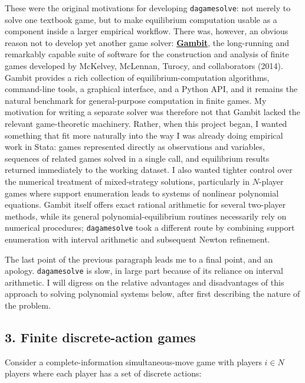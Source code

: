 \documentclass[11pt]{article}
\begin{document}
These were the original motivations for developing \texttt{dagamesolve}:
not merely to solve one textbook game, but to make equilibrium
computation usable as a component inside a larger empirical workflow.
There was, however, an obvious reason not to develop yet another game
solver: \href{https://www.gambit-project.org/}{\textbf{Gambit}}, the
long-running and remarkably capable suite of software for the
construction and analysis of finite games developed by McKelvey,
McLennan, Turocy, and collaborators (2014). Gambit provides a rich
collection of equilibrium-computation algorithms, command-line tools, a
graphical interface, and a Python API, and it remains the natural
benchmark for general-purpose computation in finite games. My motivation
for writing a separate solver was therefore not that Gambit lacked the
relevant game-theoretic machinery. Rather, when this project began, I
wanted something that fit more naturally into the way I was already
doing empirical work in Stata: games represented directly as
observations and variables, sequences of related games solved in a
single call, and equilibrium results returned immediately to the working
dataset. I also wanted tighter control over the numerical treatment of
mixed-strategy solutions, particularly in \(N\)-player games where
support enumeration leads to systems of nonlinear polynomial equations.
Gambit itself offers exact rational arithmetic for several two-player
methods, while its general polynomial-equilibrium routines necessarily
rely on numerical procedures; \texttt{dagamesolve} took a different
route by combining support enumeration with interval arithmetic and
subsequent Newton refinement.

The last point of the previous paragraph leads me to a final point, and
an apology. \texttt{dagamesolve} is slow, in large part because of its
reliance on interval arithmetic. I will digress on the relative
advantages and disadvantages of this approach to solving polynomial
systems below, after first describing the nature of the problem.

    \hypertarget{finite-discrete-action-games}{%
\subsection{3. Finite discrete-action
games}\label{finite-discrete-action-games}}

Consider a complete-information simultaneous-move game with players
\(i \in N\) players where each player has a set of discrete actions:
\end{document}
